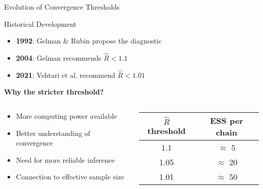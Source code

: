 \documentclass[aspectratio=169]{beamer}
\begin{document}
\begin{frame}{Evolution of Convergence Thresholds}
	\begin{block}{Historical Development}
		\begin{itemize}
			\item \textbf{1992}: Gelman \& Rubin propose the diagnostic
			\item \textbf{2004}: Gelman recommends $\hat{R} < 1.1$
			\item \textbf{2021}: Vehtari et al. recommend $\hat{R} < 1.01$
		\end{itemize}
	\end{block}

	\vspace{0.5cm}
	\textbf{Why the stricter threshold?}

	\begin{columns}
		\begin{column}{0.5\textwidth}
			\begin{itemize}
				\item More computing power available
				\item Better understanding of convergence
				\item Need for more reliable inference
				\item Connection to effective sample size
			\end{itemize}
		\end{column}
		\begin{column}{0.5\textwidth}
			\begin{center}
				\begin{tabular}{|c|c|}
					\hline
					$\hat{R}$ threshold & ESS per chain \\
					\hline
					1.1                 & $\approx$ 5   \\
					1.05                & $\approx$ 20  \\
					1.01                & $\approx$ 50  \\
					\hline
				\end{tabular}
			\end{center}
		\end{column}
	\end{columns}
\end{frame}
\end{document}
